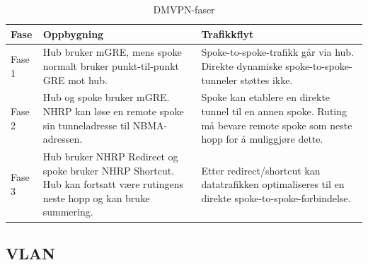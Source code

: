\begin{table}[H]

\centering

\caption{DMVPN-faser}

\label{tab:dmvpn-faser}

\small

\renewcommand{\arraystretch}{1.25}

\begin{tabular}{@{}lll@{}}

\toprule

\parbox[t]{0.16\textwidth}{\textbf{Fase}} & \parbox[t]{0.34\textwidth}{\textbf{Oppbygning}} & \parbox[t]{0.34\textwidth}{\textbf{Trafikkflyt}} \\

\midrule

\parbox[t]{0.16\textwidth}{Fase 1} & \parbox[t]{0.34\textwidth}{\raggedright Hub bruker mGRE, mens spoke normalt bruker punkt-til-punkt GRE mot hub.} & \parbox[t]{0.34\textwidth}{\raggedright Spoke-to-spoke-trafikk går via hub. Direkte dynamiske spoke-to-spoke-tunneler støttes ikke.} \\

\addlinespace

\parbox[t]{0.16\textwidth}{Fase 2} & \parbox[t]{0.34\textwidth}{\raggedright Hub og spoke bruker mGRE. NHRP kan løse en remote spoke sin tunneladresse til NBMA-adressen.} & \parbox[t]{0.34\textwidth}{\raggedright Spoke kan etablere en direkte tunnel til en annen spoke. Ruting må bevare remote spoke som neste hopp for å muliggjøre dette.} \\

\addlinespace

\parbox[t]{0.16\textwidth}{Fase 3} & \parbox[t]{0.34\textwidth}{\raggedright Hub bruker NHRP Redirect og spoke bruker NHRP Shortcut. Hub kan fortsatt være rutingens neste hopp og kan bruke summering.} & \parbox[t]{0.34\textwidth}{\raggedright Etter redirect/shortcut kan datatrafikken optimaliseres til en direkte spoke-to-spoke-forbindelse.} \\

\bottomrule

\end{tabular}

\end{table}

\subsection{VLAN}

